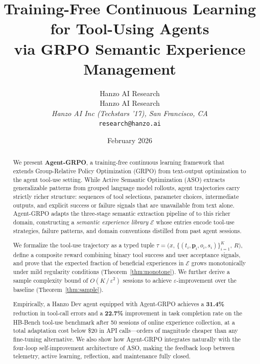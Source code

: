 \documentclass[11pt]{article}
\title{Training-Free Continuous Learning for Tool-Using Agents\\
via GRPO Semantic Experience Management}
\author{
    Hanzo AI Research \\
    Hanzo AI Research\\
    \textit{Hanzo AI Inc (Techstars '17), San Francisco, CA}\\
    \texttt{research@hanzo.ai}
}
\date{February 2026}
\begin{document}
\hanzocoverpage

\begin{abstract}
We present \textbf{Agent-GRPO}, a training-free continuous learning framework
that extends Group-Relative Policy Optimization (GRPO) from text-output
optimization to the agent tool-use setting. While Active Semantic Optimization
(ASO) extracts generalizable patterns from grouped language model rollouts,
agent trajectories carry strictly richer structure: sequences of tool
selections, parameter choices, intermediate outputs, and explicit success or
failure signals that are unavailable from text alone. Agent-GRPO adapts the
three-stage semantic extraction pipeline of \cite{tencent2025youtoagent} to
this richer domain, constructing a \emph{semantic experience library}
$\mathcal{E}$ whose entries encode tool-use strategies, failure patterns, and
domain conventions distilled from past agent sessions.

We formalize the tool-use trajectory as a typed tuple
$\tau = \bigl(x,\,\{(t_i, \bm{p}_i, o_i, s_i)\}_{i=1}^K,\, R\bigr)$, define
a composite reward combining binary tool success and user acceptance signals,
and prove that the expected fraction of beneficial experiences in $\mathcal{E}$
grows monotonically under mild regularity conditions (Theorem~\ref{thm:monotone}).
We further derive a sample complexity bound of $O(K\,/\,\varepsilon^2)$ sessions
to achieve $\varepsilon$-improvement over the baseline (Theorem~\ref{thm:sample}).

Empirically, a Hanzo Dev agent equipped with Agent-GRPO achieves a
\textbf{31.4\%} reduction in tool-call errors and a \textbf{22.7\%} improvement
in task completion rate on the HB-Bench tool-use benchmark after 50 sessions of
online experience collection, at a total adaptation cost below \$20 in API
calls---orders of magnitude cheaper than any fine-tuning alternative. We also
show how Agent-GRPO integrates naturally with the four-loop self-improvement
architecture of ASO, making the feedback loop between telemetry, active
learning, reflection, and maintenance fully closed.
\end{abstract}

\end{document}
